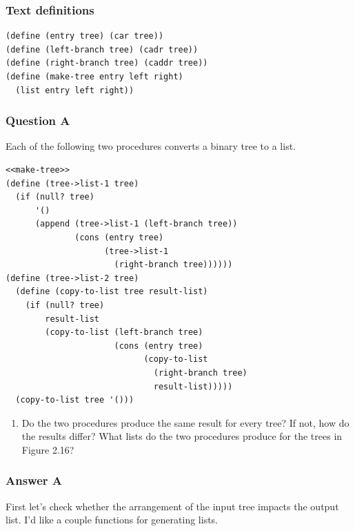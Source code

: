 \documentclass[final,fleqn,titlepage,twoside]{article}
\begin{document}
\subsubsection{Text definitions}
\label{sec:org520c597}
\begin{verbatim}
(define (entry tree) (car tree))
(define (left-branch tree) (cadr tree))
(define (right-branch tree) (caddr tree))
(define (make-tree entry left right)
  (list entry left right))
\end{verbatim}

\subsubsection{Question A}
\label{sec:org9b59e53}
Each of the following two
procedures converts a binary tree to a list.

\begin{verbatim}
<<make-tree>>
(define (tree->list-1 tree)
  (if (null? tree)
      '()
      (append (tree->list-1 (left-branch tree))
              (cons (entry tree)
                    (tree->list-1
                      (right-branch tree))))))
(define (tree->list-2 tree)
  (define (copy-to-list tree result-list)
    (if (null? tree)
        result-list
        (copy-to-list (left-branch tree)
                      (cons (entry tree)
                            (copy-to-list
                              (right-branch tree)
                              result-list)))))
  (copy-to-list tree '()))
\end{verbatim}

\begin{enumerate}
\item Do the two procedures produce the same result for every tree? If not, how do
the results differ? What lists do the two procedures produce for the trees in
Figure 2.16?
\end{enumerate}

\subsubsection{Answer A}
\label{sec:orgf3d5723}
First let's check whether the arrangement of the input tree impacts the output
list. I'd like a couple functions for generating lists.
\end{document}
